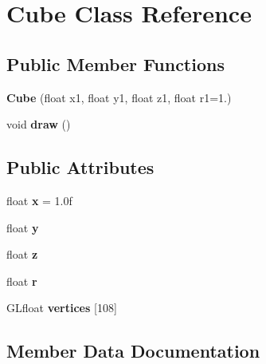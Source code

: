 \hypertarget{class_cube}{}\section{Cube Class Reference}
\label{class_cube}
\subsection*{Public Member Functions}
\begin{DoxyCompactItemize}
\item 
\mbox{\label{class_cube_a49aeb021ee94d8281944170ba293491a}} 
{\bfseries Cube} (float x1, float y1, float z1, float r1=1.)
\item 
\mbox{\label{class_cube_ab26b72a81376fd5dc4fcc7f0b715b087}} 
void {\bfseries draw} ()
\end{DoxyCompactItemize}
\subsection*{Public Attributes}
\begin{DoxyCompactItemize}
\item 
\mbox{\label{class_cube_a3e0558b8c87b7a13cd7182255cbc190b}} 
float {\bfseries x} = 1.\+0f
\item 
\mbox{\label{class_cube_a5710bde4446d58489fdf4eb4fc091c43}} 
float {\bfseries y}
\item 
\mbox{\label{class_cube_a5470969e64ec3adb5299ac7a0362df02}} 
float {\bfseries z}
\item 
\mbox{\label{class_cube_a8a4af26ee6d9ead878aea2b34d92eb2e}} 
float {\bfseries r}
\item 
G\+Lfloat {\bfseries vertices} \mbox{[}108\mbox{]}
\end{DoxyCompactItemize}


\subsection{Member Data Documentation}
\mbox{\label{class_cube_a85348252cbcb13296e1786d0368ccf09}} 
